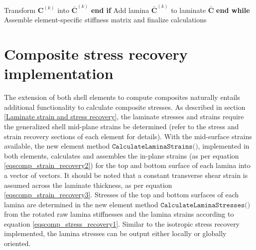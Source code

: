 \begin{algorithm}
\begin{algorithmic}[1]
		\State \hspace{\algorithmicindent} \hspace{\algorithmicindent} \hspace{\algorithmicindent} \hspace{\algorithmicindent} \hspace{\algorithmicindent} Transform $\mathbf{C}^{(k)}$ into $\bar{\mathbf{C}}^{(k)}$
		\State \hspace{\algorithmicindent} \hspace{\algorithmicindent} \hspace{\algorithmicindent} \hspace{\algorithmicindent}\textbf{end if}
		\State \hspace{\algorithmicindent} \hspace{\algorithmicindent} \hspace{\algorithmicindent} \hspace{\algorithmicindent}Add lamina $\bar{\mathbf{C}}^{(k)}$ to laminate $\bar{\mathbf{C}}$
		\State \hspace{\algorithmicindent} \hspace{\algorithmicindent} \hspace{\algorithmicindent} \textbf{end while}
		\State \hspace{\algorithmicindent}Assemble element-specific stiffness matrix and finalize calculations
	\end{algorithmic}
\end{algorithm}

\section{Composite stress recovery implementation}
\label{composite stress recovery}
The extension of both shell elements to compute composites naturally entails additional functionality to calculate composite stresses. As described in section \ref{Laminate strain and stress recovery}, the laminate stresses and strains require the generalized shell mid-plane strains be determined (refer to the stress and strain recovery sections of each element for details). With the mid-surface strains available, the new element method $\texttt{CalculateLaminaStrains()}$, implemented in both elements, calculates and assembles the in-plane strains (as per equation \ref{eqscomp_strain_recovery2}) for the top and bottom surface of each lamina into a vector of vectors. It should be noted that a constant transverse shear strain is assumed across the laminate thickness, as per equation \ref{eqscomp_strain_recovery3}. Stresses of the top and bottom surfaces of each lamina are determined in the new element method $\texttt{CalculateLaminaStresses()}$ from the rotated raw lamina stiffnesses and the lamina strains according to equation \ref{eqscomp_stress_recovery1}. Similar to the isotropic stress recovery implemented, the lamina stresses can be output either locally or globally oriented.

